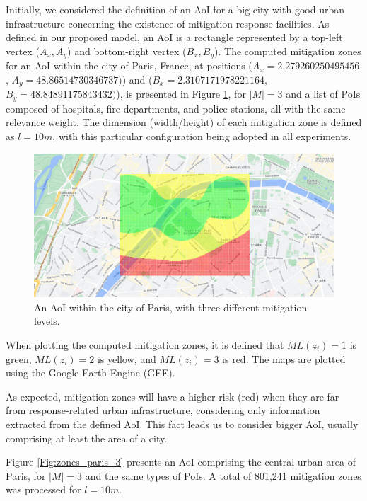 \begin{refsection}
Initially, we considered the definition of an AoI for a big city with good urban infrastructure concerning the existence of mitigation response facilities. As defined in our proposed model, an AoI is a rectangle represented by a top-left vertex ($A_x,A_y$) and bottom-right vertex ($B_x,B_y$). The computed mitigation zones for an AoI within the city of Paris, France, at positions ($A_x = 2.279260250495456$, $A_y = 48.86514730346737)$) and ($B_x = 2.3107171978221164$, $B_y = 48.84891175843432)$), is presented in Figure \ref{Fig:zones_paris_0}, for $|M|=3$ and a list of PoIs composed of hospitals, fire departments, and police stations, all with the same relevance weight. The dimension (width/height) of each mitigation zone is defined as $l = 10m$, with this particular configuration being adopted in all experiments.

\begin{figure}[ht!]
    \centering
    \includegraphics[width=0.9\linewidth]{Chapters/2-EDUs/images/eiffel_M3.png}
    \caption{An AoI within the city of Paris, with three different mitigation levels.}
    \label{Fig:zones_paris_0}
\end{figure}

When plotting the computed mitigation zones, it is defined that $ML(z_i)=1$ is green, $ML(z_i)=2$ is yellow, and $ML(z_i)=3$ is red. The maps are plotted using the Google Earth Engine (GEE).

As expected, mitigation zones will have a higher risk (red) when they are far from response-related urban infrastructure, considering only information extracted from the defined AoI. This fact leads us to consider bigger AoI, usually comprising at least the area of a city.

Figure \ref{Fig:zones_paris_3} presents an AoI comprising the central urban area of Paris, for $|M|=3$ and the same types of PoIs. A total of 801,241 mitigation zones was processed for $l = 10m$.


\end{refsection}
